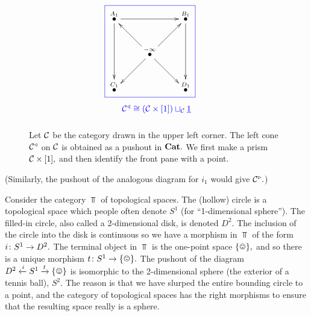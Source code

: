 \documentclass[CT4S-EN-RU]{subfiles}
\begin{document}
\begin{exampleENG}
\begin{figure}[H]
$$\parbox{1.7in}{\cfbox{blue}{\parbox{1.7in}{
\xymatrix{
\LMO{A_1}\ar[rr]\ar[dd]&&\LMO{B_1}\ar[dd]\\
&\LMO{-\infty}\ar[ur]\ar[dr]\ar[ul]\ar[dl]\\
\LMO{C_1}&&\LMO{D_1}}}}\begin{center}\color{blue}{$\mcC\lcone\iso(\mcC\times[1])\sqcup_{\mcC}\ul{1}$}\end{center}}
$$
\caption{Let $\mathcal{C}$ be the category drawn in the upper left corner. The left cone $\mathcal{C}^\triangleleft$ on $\mathcal{C}$ is obtained as a pushout in ${\mathbf{Cat}}.$ We first make a prism $\mathcal{C}\times[1],$ and then identify the front pane with a point.}
\label{fig:left cone}
\end{figure}
(Similarly, the pushout of the analogous diagram for $i_1$ would give $\mathcal{C}^\triangleright.$)
\end{exampleENG}

\begin{exampleRUS}
\end{exampleRUS}

\begin{exampleENG}\label{ex:pushout in Top}
Consider the category $\Top$ of topological spaces. The (hollow) circle is a topological space which people often denote $S^1$ (for “1-dimensional sphere”). The filled-in circle, also called a 2-dimensional disk, is denoted $D^2.$ The inclusion of the circle into the disk is continuous so we have a morphism in $\Top$ of the form $i\colon S^1\rightarrow D^2.$ The terminal object in $\Top$ is the one-point space $\singleton,$ and so there is a unique morphism $t\taking S^1\to\singleton.$ The pushout of the diagram $D^2\From{i}S^1\To{t}\singleton$ is isomorphic to the 2-dimensional sphere (the exterior of a tennis ball), $S^2.$ The reason is that we have slurped the entire bounding circle to a point, and the category of topological spaces has the right morphisms to ensure that the resulting space really is a sphere. 
\end{exampleENG}

\begin{exampleRUS}\label{ex:pushout in Top}
\end{exampleRUS}
\end{document}
